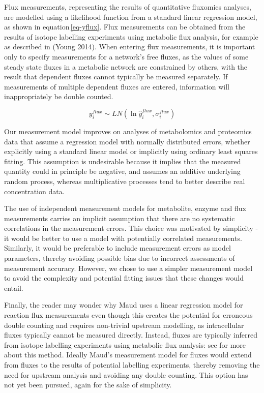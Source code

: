 \documentclass[journal=asbcd6,manuscript=article,layout=traditional]{achemso}
\begin{document}
Flux measurements, representing the results of quantitative fluxomics
analyses, are modelled using a likelihood function from a standard
linear regression model, as shown in equation\,\eqref{eq-yflux}. Flux
measurements can be obtained from the results of isotope labelling
experiments using metabolic flux analysis, for example as described in
(Young 2014). When entering flux measurements, it is important only to
specify measurements for a network's free fluxes, as the values of some
steady state fluxes in a metabolic network are constrained by others,
with the result that dependent fluxes cannot typically be measured
separately. If measurements of multiple dependent fluxes are entered,
information will inappropriately be double counted.

\begin{equation}
y_i^{flux} \sim LN(\ln{\hat{y}_i^{flux}}, \sigma_i^{flux})\label{eq-yflux}
\end{equation}

Our measurement model improves on analyses of metabolomics and
proteomics data that assume a regression model with normally distributed
errors, whether explicitly using a standard linear model or implicitly
using ordinary least squares fitting. This assumption is undesirable
because it implies that the measured quantity could in principle be
negative, and assumes an additive underlying random process, whereas
multiplicative processes tend to better describe real concentration
data.

The use of independent measurement models for metabolite, enzyme and
flux measurements carries an implicit assumption that there are no
systematic correlations in the measurement errors. This choice was
motivated by simplicity - it would be better to use a model with
potentially correlated measurements. Similarly, it would be preferable
to include measurement errors as model parameters, thereby avoiding
possible bias due to incorrect assessments of measurement accuracy.
However, we chose to use a simpler measurement model to avoid the
complexity and potential fitting issues that these changes would entail.

Finally, the reader may wonder why Maud uses a linear regression model
for reaction flux measurements even though this creates the potential
for erroneous double counting and requires non-trivial upstream
modelling, as intracellular fluxes typically cannot be measured
directly. Instead, fluxes are typically inferred from isotope labelling
experiments using metabolic flux analysis: see
\citet{daiUnderstandingMetabolismFlux2017} for more about this method.
Ideally Maud's measurement model for fluxes would extend from fluxes to
the results of potential labelling experiments, thereby removing the
need for upstream analysis and avoiding any double counting. This option
has not yet been pursued, again for the sake of simplicity.
\end{document}
